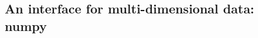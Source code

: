 \documentclass[thesis]{subfiles}
\begin{document}
%
%


\subsection{An interface for multi-dimensional data: numpy}

\end{document}
